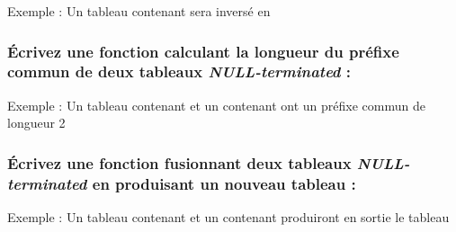 \documentclass[11pt,a4paper]{article}
\begin{document}
\setlength\fboxrule{0.2pt}
Exemple : Un tableau contenant  sera inversé en 
\setlength\fboxrule{0.4pt}

%

\medskip




\bigskip

\subsubsection{\'Ecrivez une fonction calculant la longueur du préfixe commun de deux tableaux \textit{NULL-terminated} : }

\setlength\fboxrule{0.2pt}
Exemple : Un tableau contenant  et un contenant  ont un préfixe commun de longueur 2
\setlength\fboxrule{0.4pt}

%

\medskip




\bigskip

\subsubsection{\'Ecrivez une fonction fusionnant deux tableaux \textit{NULL-terminated} en produisant un nouveau tableau : }

\setlength\fboxrule{0.2pt}
Exemple : Un tableau contenant  et un contenant  produiront en sortie le tableau 
\setlength\fboxrule{0.4pt}

%
\end{document}
